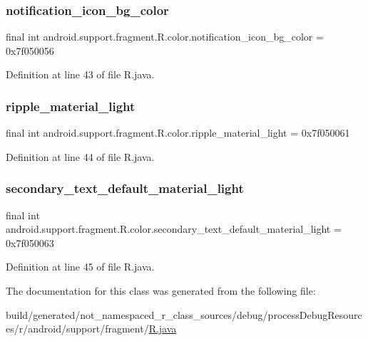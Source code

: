 \subsubsection{\texorpdfstring{notification\_icon\_bg\_color}{notification\_icon\_bg\_color}}
{\footnotesize\ttfamily final int android.\+support.\+fragment.\+R.\+color.\+notification\+\_\+icon\+\_\+bg\+\_\+color = 0x7f050056\hspace{0.3cm}{\ttfamily [static]}}



Definition at line 43 of file R.\+java.

\mbox{\label{classandroid_1_1support_1_1fragment_1_1_r_1_1color_a7480abdd10ed4536230e8eb53b54c0a0}} 
\subsubsection{\texorpdfstring{ripple\_material\_light}{ripple\_material\_light}}
{\footnotesize\ttfamily final int android.\+support.\+fragment.\+R.\+color.\+ripple\+\_\+material\+\_\+light = 0x7f050061\hspace{0.3cm}{\ttfamily [static]}}



Definition at line 44 of file R.\+java.

\mbox{\label{classandroid_1_1support_1_1fragment_1_1_r_1_1color_a7c56b5616006a7293aa178691505aa2d}} 
\subsubsection{\texorpdfstring{secondary\_text\_default\_material\_light}{secondary\_text\_default\_material\_light}}
{\footnotesize\ttfamily final int android.\+support.\+fragment.\+R.\+color.\+secondary\+\_\+text\+\_\+default\+\_\+material\+\_\+light = 0x7f050063\hspace{0.3cm}{\ttfamily [static]}}



Definition at line 45 of file R.\+java.



The documentation for this class was generated from the following file\+:\begin{DoxyCompactItemize}
\item 
build/generated/not\+\_\+namespaced\+\_\+r\+\_\+class\+\_\+sources/debug/process\+Debug\+Resources/r/android/support/fragment/\mbox{\hyperlink{android_2support_2fragment_2_r_8java}{R.\+java}}\end{DoxyCompactItemize}
